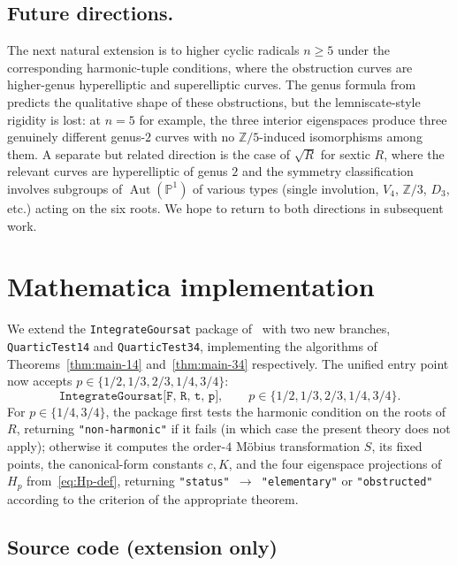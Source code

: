 \documentclass[11pt,a4paper]{article}
\theoremstyle{plain}
\theoremstyle{definition}
\theoremstyle{remark}
\newcommand{\Z}{\mathbb{Z}}
\newcommand{\Aut}{\operatorname{Aut}}
\begin{document}
\subsection*{Future directions.}
The next natural extension is to higher cyclic radicals $n \geq 5$ under the corresponding harmonic-tuple conditions, where the obstruction curves are higher-genus hyperelliptic and superelliptic curves. The genus formula from~\cite{GoursatCubic} predicts the qualitative shape of these obstructions, but the lemniscate-style rigidity is lost: at $n = 5$ for example, the three interior eigenspaces produce three genuinely different genus-$2$ curves with no $\Z/5$-induced isomorphisms among them. A separate but related direction is the case of $\sqrt{R}$ for sextic $R$, where the relevant curves are hyperelliptic of genus $2$ and the symmetry classification involves subgroups of $\Aut(\mathbb{P}^1)$ of various types (single involution, $V_4$, $\Z/3$, $D_3$, etc.) acting on the six roots. We hope to return to both directions in subsequent work.

\appendix
\section{Mathematica implementation}\label{sec:appendix}

We extend the \texttt{IntegrateGoursat} package of~\cite{GoursatCubic} with two new branches, \texttt{QuarticTest14} and \texttt{QuarticTest34}, implementing the algorithms of Theorems~\ref{thm:main-14} and~\ref{thm:main-34} respectively. The unified entry point now accepts $p \in \{1/2, 1/3, 2/3, 1/4, 3/4\}$:
\[
  \texttt{IntegrateGoursat[F, R, t, p]}, \qquad p \in \{1/2, 1/3, 2/3, 1/4, 3/4\}.
\]
For $p \in \{1/4, 3/4\}$, the package first tests the harmonic condition on the roots of $R$, returning \texttt{"non-harmonic"} if it fails (in which case the present theory does not apply); otherwise it computes the order-$4$ Möbius transformation $S$, its fixed points, the canonical-form constants $c, K$, and the four eigenspace projections of $H_p$ from~\eqref{eq:Hp-def}, returning \texttt{"status" $\to$ "elementary"} or \texttt{"obstructed"} according to the criterion of the appropriate theorem.

\subsection*{Source code (extension only)}
\end{document}
